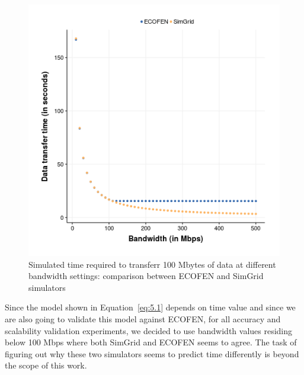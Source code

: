 \begin{figure}[ht]
	\begin{center}
		\includegraphics[width=14cm]{images/ex18_bw_time_sg_vs_ns3}
		\caption{Simulated time required to transferr 100 Mbytes of data at different bandwidth settings: comparison between ECOFEN and SimGrid simulators}
		\label{fig:bandwidthvstime}
	\end{center}
\end{figure}

Since the model shown in Equation~\ref{eq:5.1} depends on time value and since we are also going to validate this model against ECOFEN, for all accuracy and scalability validation experiments, we decided to use bandwidth values residing below 100 Mbps where both SimGrid and ECOFEN seems to agree. The task of figuring out why these two simulators seems to predict time differently is beyond the scope of this work. 

